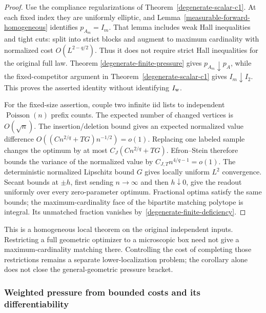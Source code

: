 \documentclass[11pt,reqno]{amsart}
\theoremstyle{definition}
\theoremstyle{remark}
\numberwithin{equation}{section}
\begin{document}
\begin{proof}
Use the compliance regularizations of
Theorem~\ref{degenerate-scalar-c1}. At each fixed index they are
uniformly elliptic, and Lemma~\ref{measurable-forward-homogeneous}
identifies \(p_{A_m}=I_m\). That lemma includes weak Hall inequalities
and tight cuts: split into strict blocks and augment to maximum
cardinality with normalized cost \(O(L^{2-q/2})\). Thus it does not
require strict Hall inequalities for the original full law. Theorem
\ref{degenerate-finite-pressure} gives \(p_{A_m}\downarrow p_A\),
while the fixed-competitor argument in
Theorem~\ref{degenerate-scalar-c1} gives \(I_m\downarrow I_2\).
This proves the asserted identity without identifying \(I_{\rm w}\).

For the fixed-size assertion, couple two infinite iid lists to independent
\(\operatorname{Poisson}(n)\) prefix counts. The expected number of
changed vertices is \(O(\sqrt n)\). The insertion/deletion bound gives
an expected normalized value difference
\(O((Cn^{2/q}+TG)n^{-1/2})=o(1)\). Replacing one labeled sample
changes the optimum by at most \(C_J(Cn^{2/q}+TG)\). Efron--Stein
therefore bounds the variance of the normalized value by
\(C_{J,T}n^{4/q-1}=o(1)\). The deterministic normalized Lipschitz
bound \(G\) gives locally uniform \(L^2\) convergence. Secant bounds
at \(\pm h\), first sending \(n\to\infty\) and then \(h\downarrow0\),
give the readout uniformly over every zero-parameter optimum. Fractional
optima satisfy the same bounds; the maximum-cardinality face of the
bipartite matching polytope is integral. Its unmatched fraction vanishes
by~\eqref{degenerate-finite-deficiency}.
\end{proof}

This is a homogeneous local theorem on the original independent inputs.
Restricting a full geometric optimizer to a microscopic box need not
give a maximum-cardinality matching there. Controlling the cost of
completing those restrictions remains a separate lower-localization
problem; the corollary alone does not close the general-geometric
pressure bracket.

\subsubsection{Weighted pressure from bounded costs and its differentiability}
\label{weighted-capped-section}
\end{document}
